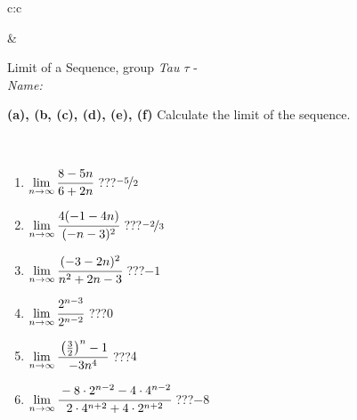 \documentclass[10pt]{report}
\begin{document}
\begin{tabular}{c:c}
\begin{minipage}[c][104.5mm][t]{0.5\linewidth}
\begin{center}
\begin{minipage}{0.20\linewidth}
\begin{center}
\end{center}
\end{minipage}
\end{center}
\end{minipage}
&
\begin{minipage}[c][104.5mm][t]{0.5\linewidth}
\begin{center}
\vspace{5mm}
{\huge Limit of a Sequence, group \textit{Tau $\tau$} -}\\[5mm]
\textit{Name:}\phantom{xxxxxxxxxxxxxxxxxxxxxxxxxxxxxxxxxxxxxxxxxxxxxxxxxxxxxxxxxxxxxxxxx}\\[5mm]
\begin{minipage}{0.95\linewidth}
\begin{center}
{
\textbf{(a), (b, (c), (d), (e), (f)} Calculate the limit of the sequence. \\[-1mm]
\phantom{x}
}
\end{center}
\end{minipage}
\\[1mm]
\begin{minipage}{0.79\linewidth}
\begin{center}
\begin{varwidth}{\linewidth}
\setlength{\itemsep}{0pt}
\begin{enumerate}
\normalsize
\item $\lim\limits_{n\to\infty}\cfrac{8-5n}{6+2n}$\quad \dotfill\; ???\;\dotfill \quad $\nicefrac{-5}{2}$
\item $\lim\limits_{n\to\infty}\cfrac{4(-1-4n)}{(-n-3)^2}$\quad \dotfill\; ???\;\dotfill \quad $\nicefrac{-2}{3}$
\item $\lim\limits_{n\to\infty}\cfrac{(-3-2n)^2}{n^2+2n-3}$\quad \dotfill\; ???\;\dotfill \quad $-1$
\item $\lim\limits_{n\to\infty}\cfrac{2^{n-3}}{2^{n-2}}$\quad \dotfill\; ???\;\dotfill \quad $0$
\item $\lim\limits_{n\to\infty}\cfrac{\left(\frac{3}{2}\right)^n -1}{-3n^{4}}$\quad \dotfill\; ???\;\dotfill \quad $4$
\item $\lim\limits_{n\to\infty}\cfrac{-8\cdot 2^{n-2}-4\cdot 4^{n-2}}{2\cdot 4^{n+2}+4\cdot 2^{n+2}}$\quad \dotfill\; ???\;\dotfill \quad $-8$
\end{enumerate}
\end{varwidth}
\end{center}
\end{minipage}
\begin{minipage}{0.20\linewidth}
\begin{center}

\end{center}
\end{minipage}
\end{center}
\end{minipage}
\end{tabular}
\end{document}

